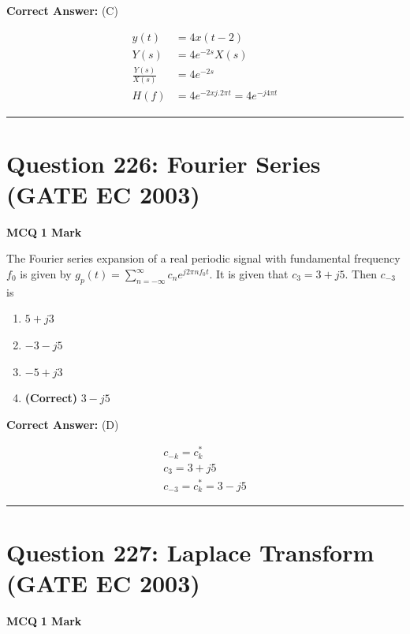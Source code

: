 \documentclass[11pt,a4paper]{article}
\begin{document}
\noindent \textbf{Correct Answer:} (C)

\begin{tcolorbox}[solbox, title=Detailed Solution -- Question 225]
\[
\begin{aligned} y(t) &=4 x(t-2) \\ Y(s) &=4 e^{-2 s} X(s) \\ \frac{Y(s)}{X(s)} &=4 e^{-2 s} \\ H(f) &=4 e^{-2 x j .2 \pi t}=4 e^{-j 4 \pi t} \end{aligned}
\]
\end{tcolorbox}

\vspace{1.5em}
\hrule
\vspace{1.5em}

\section*{Question 226: Fourier Series (GATE EC 2003)}
\noindent \textbf{\color{primary}MCQ} \hfill \textbf{\color{secondary}1 Mark}


\noindent The Fourier series expansion of a real periodic signal with fundamental frequency $f_{0}$ is given by $g_{p}(t)=\sum_{n=-\infty }^{\infty}c_{n}e^{j2\pi  nf_{0}t}$. It is given that $c_{3}=3+j5$. Then $c_{-3}$ is


\begin{enumerate}[label=(\Alph*)]
    \item $5+j3$
    \item $-3-j5$
    \item $-5+j3$
    \item \textbf{(Correct)} $3-j5$
\end{enumerate}

\noindent \textbf{Correct Answer:} (D)

\begin{tcolorbox}[solbox, title=Detailed Solution -- Question 226]
\[
\begin{array}{l} c_{-k}=c_{k}^{*} \\ c_{3}=3+j 5 \\ c_{-3}=c_{k}^{*}=3-j 5 \end{array}
\]
\end{tcolorbox}

\vspace{1.5em}
\hrule
\vspace{1.5em}

\section*{Question 227: Laplace Transform (GATE EC 2003)}
\noindent \textbf{\color{primary}MCQ} \hfill \textbf{\color{secondary}1 Mark}
\end{document}
